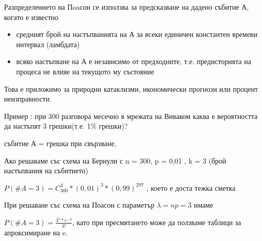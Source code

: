 \documentclass[fleqn,12pt]{article}
\begin{document}
\begin{justify}
Разпределението на Пoaсон се използва за предсказване на дадено събитие А, когато е известно
\begin{itemize}
    \item средният брой на настъпванията на А за всеки единичен константен времеви интервал (ламбдата)
    \item всяко настъпване на А е независимо от предходните, т.е. предисторията на процеса не влияе на текущото му 
    състояние
\end{itemize}

Това е приложимо за природни катаклизми, икономически прогнози или процент неизправности.

Пример : при 300 разговора месечно в мрежата на Виваком каква е вероятността да настъпят 3 грешки(т.е. 1\% грешки)?

събитие А = {грешка при свързване}, 

Ако решаваме със схема на Бернули с n = 300, p = 0,01 , k = 3 (брой настъпвания на събитието)

$P(\#A = 3) = C_{300}^3 * (0,01) ^ 3 * (0,99)^{297}$ , което е доста тежка сметка

При решаване със схема на Поасон с параметър $\lambda = np = 3$ имаме

$P(\#A = 3) = \frac{3^3 * e^{-3}}{3!}$, като при пресмятането може да ползваме таблици за апроксимиране на e.
\end{justify}
\end{document}
